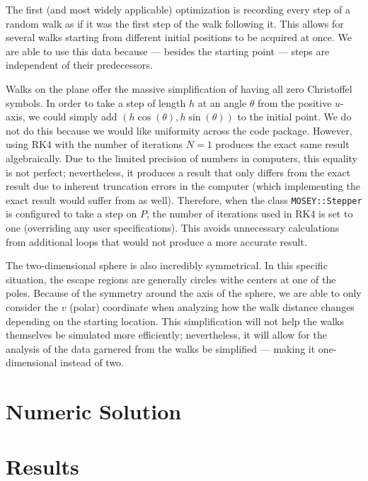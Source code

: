 \documentclass{article}
\begin{document}
	The first (and most widely applicable) optimization is recording every step of a random walk as if it was the first step of the walk following it.
	This allows for several walks starting from different initial positions to be acquired at once.
	We are able to use this data because --- besides the starting point --- steps are independent of their predecessors.
	
	Walks on the plane offer the massive simplification of having all zero Christoffel symbols.
	In order to take a step of length $h$ at an angle $\theta$ from the positive $u$-axis, we could simply add $(h\cos(\theta), h\sin(\theta))$ to the initial point.
	We do not do this because we would like uniformity across the code package.
	However, using RK4 with the number of iterations $N = 1$ produces the exact same result algebraically.
	Due to the limited precision of numbers in computers, this equality is not perfect; nevertheless, it produces a result that only differs from the exact result due to inherent truncation errors in the computer (which implementing the exact result would suffer from as well).
	Therefore, when the class \texttt{MOSEY::Stepper} is configured to take a step on $P$, the number of iterations used in RK4 is set to one (overriding any user specifications).
	This avoids unnecessary calculations from additional loops that would not produce a more accurate result.
	
	The two-dimensional sphere is also incredibly symmetrical. In this specific situation, the escape regions are generally circles withe centers at one of the poles.
	Because of the symmetry around the axis of the sphere, we are able to only consider the $v$ (polar) coordinate when analyzing how the walk distance changes depending on the starting location.
	This simplification will not help the walks themselves be simulated more efficiently; nevertheless, it will allow for the analysis of the data garnered from the walks be simplified --- making it one-dimensional instead of two.

\section{Numeric Solution}

\section{Results}



\end{document}
